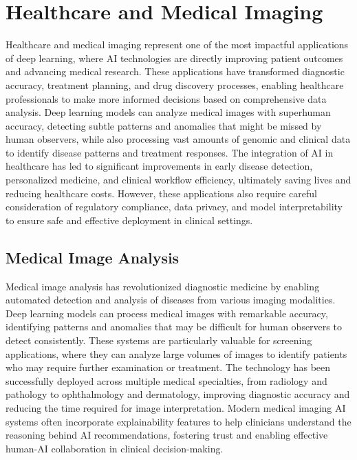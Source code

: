 
\section{Healthcare and Medical Imaging }
\label{sec:healthcare-applications}

Healthcare and medical imaging represent one of the most impactful applications of deep learning, where AI technologies are directly improving patient outcomes and advancing medical research. These applications have transformed diagnostic accuracy, treatment planning, and drug discovery processes, enabling healthcare professionals to make more informed decisions based on comprehensive data analysis. Deep learning models can analyze medical images with superhuman accuracy, detecting subtle patterns and anomalies that might be missed by human observers, while also processing vast amounts of genomic and clinical data to identify disease patterns and treatment responses. The integration of AI in healthcare has led to significant improvements in early disease detection, personalized medicine, and clinical workflow efficiency, ultimately saving lives and reducing healthcare costs. However, these applications also require careful consideration of regulatory compliance, data privacy, and model interpretability to ensure safe and effective deployment in clinical settings.

\subsection{Medical Image Analysis}

Medical image analysis has revolutionized diagnostic medicine by enabling automated detection and analysis of diseases from various imaging modalities. Deep learning models can process medical images with remarkable accuracy, identifying patterns and anomalies that may be difficult for human observers to detect consistently. These systems are particularly valuable for screening applications, where they can analyze large volumes of images to identify patients who may require further examination or treatment. The technology has been successfully deployed across multiple medical specialties, from radiology and pathology to ophthalmology and dermatology, improving diagnostic accuracy and reducing the time required for image interpretation. Modern medical imaging AI systems often incorporate explainability features to help clinicians understand the reasoning behind AI recommendations, fostering trust and enabling effective human-AI collaboration in clinical decision-making.

